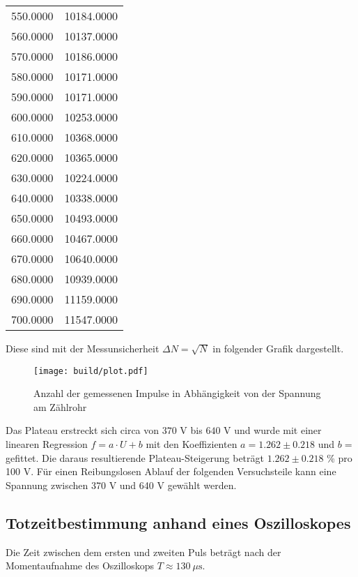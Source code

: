 \begin{table}[H]
\begin{tabular}{c c}
    550.0000 & 10184.0000 \\   
    560.0000 & 10137.0000 \\   
    570.0000 & 10186.0000 \\   
    580.0000 & 10171.0000 \\   
    590.0000 & 10171.0000 \\   
    600.0000 & 10253.0000 \\   
    610.0000 & 10368.0000 \\   
    620.0000 & 10365.0000 \\   
    630.0000 & 10224.0000 \\   
    640.0000 & 10338.0000 \\   
    650.0000 & 10493.0000 \\   
    660.0000 & 10467.0000 \\   
    670.0000 & 10640.0000 \\
    680.0000 & 10939.0000 \\   
    690.0000 & 11159.0000 \\
    700.0000 & 11547.0000 \\ 
    \bottomrule
    \end{tabular}
  \end{table}
  Diese sind mit der Messunsicherheit $\Delta N = \sqrt{N}$
  in folgender Grafik dargestellt.
  \begin{figure}[H]
    \centering
    \texttt{[image: build/plot.pdf]}
    \caption{Anzahl der gemessenen Impulse in Abhängigkeit von der Spannung am Zählrohr}
    \label{fig:plot}
  \end{figure}
  \noindent Das Plateau erstreckt sich circa von $370 $ V bis $640 $ V und wurde mit einer linearen 
  Regression $f = a\cdot U + b$ mit den Koeffizienten $a=1.262 \pm 0.218$ und $b=$ gefittet. 
  Die daraus resultierende Plateau-Steigerung beträgt $1.262 \pm 0.218$ \% pro 100 V. 
  Für einen Reibungslosen Ablauf der folgenden Versuchsteile kann eine Spannung zwischen
  370 V und 640 V gewählt werden.

\subsection{Totzeitbestimmung anhand eines Oszilloskopes}
  Die Zeit zwischen dem ersten und zweiten Puls
  beträgt nach der Momentaufnahme des Oszilloskops
  $T \approx \SI{130}{\mu\second}$.

